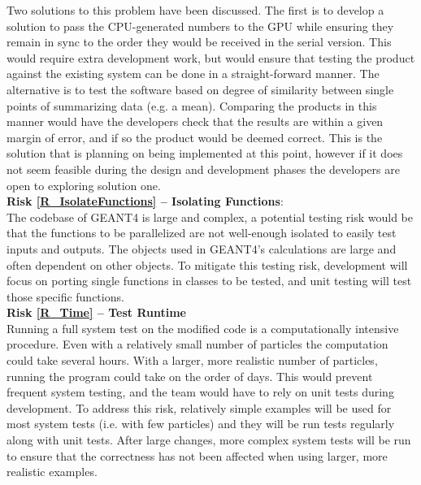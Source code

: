 \documentclass[12pt]{article}
\begin{document}
Two solutions to this problem have been discussed. The first is to develop a solution to pass the CPU-generated numbers to the GPU while ensuring they remain in sync to the order they would be received in the serial version. This would require extra development work, but would ensure that testing the product against the existing system can be done in a straight-forward manner. The alternative is to test the software based on degree of similarity between single points of summarizing data (e.g. a mean). Comparing the products in this manner would have the developers check that the results are within a given margin of error, and if so the product would be deemed correct. This is the solution that is planning on being implemented at this point, however if it does not seem feasible during the design and development phases the developers are open to exploring solution one.\\
\newpage
\textbf{Risk \ref{R_IsolateFunctions} -- Isolating Functions}:\\
The codebase of GEANT4 is large and complex, a potential testing risk would be that the functions to be parallelized are not well-enough isolated to easily test inputs and outputs. The objects used in GEANT4's calculations are large and often dependent on other objects. To mitigate this testing risk, development will focus on porting single functions in classes to be tested, and unit testing will test those specific functions.\\

\textbf{Risk \ref{R_Time} -- Test Runtime}\\
Running a full system test on the modified code is a computationally intensive procedure. Even with a relatively small number of particles the computation could take several hours. With a larger, more realistic number of particles, running the program could take on the order of days. This would prevent frequent system testing, and the team would have to rely on unit tests during development. To address this risk, relatively simple examples will be used for most system tests (i.e. with few particles) and they will be run tests regularly along with unit tests. After large changes, more complex system tests will be run to ensure that the correctness has not been affected when using larger, more realistic examples.

\end{document}
